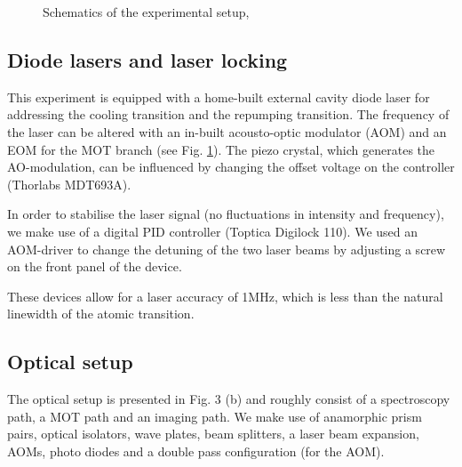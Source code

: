 \documentclass[12pt, a4paper]{article}
\begin{document}
\begin{figure}[h]
\centering
\caption{Schematics of the experimental setup, \cite{script}}
	\label{expsetup}
\end{figure}

\subsection{Diode lasers and laser locking}
This experiment is equipped with a home-built external cavity diode laser for addressing the cooling transition and the repumping transition. The frequency of the laser can be altered with an in-built acousto-optic modulator (AOM) and an EOM for the MOT branch (see Fig. \ref{expsetup}). The piezo crystal, which generates the AO-modulation, can be influenced by changing the offset voltage on the controller (Thorlabs MDT693A).

In order to stabilise the laser signal (no fluctuations in intensity and frequency), we make use of a digital PID controller (Toptica Digilock 110). We used an AOM-driver to change the detuning of the two laser beams by adjusting a screw on the front panel of the device.

These devices allow for a laser accuracy of 1MHz, which is less than the natural linewidth of the atomic transition.

\subsection{Optical setup}
The optical setup is presented in Fig. 3 (b) and roughly consist of a spectroscopy path, a MOT path and an imaging path. We make use of anamorphic prism pairs, optical isolators, wave plates, beam splitters, a laser beam expansion, AOMs, photo diodes and a double pass configuration (for the AOM).
\end{document}
